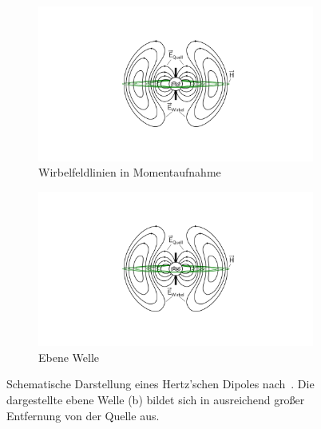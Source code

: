 \begin{figure}[ht]
    \centering
    \begin{subfigure}[b]{0.4\textwidth}
        \includegraphics[page = 1, height=0.2\textheight, trim = 10cm 4cm 9.5cm 4cm, clip]{Abbildungen/Kapitel2/Hertz-Dipol.pdf}
        \caption{Wirbelfeldlinien in Momentaufnahme}\label{subfig:2_Hertzscher_Dipol_A}
    \end{subfigure}
    \hspace{1cm}
    \begin{subfigure}[b]{0.4\textwidth}
        \includegraphics[page = 2, height=0.2\textheight, trim = 4.5cm 0cm 8cm 0cm, clip]{Abbildungen/Kapitel2/Hertz-Dipol.pdf}
        \caption{Ebene Welle}\label{subfig:2_Hertzscher_Dipol_B}
    \end{subfigure}
    \caption[Schematische Darstellung eines Hertz'schen Dipoles]{Schematische Darstellung eines Hertz'schen Dipoles nach~\cite{EM_Schirmung}. Die dargestellte ebene Welle (b) bildet sich in ausreichend großer Entfernung von der Quelle aus.}
    \label{fig:2_Hertzscher_Dipol}
\end{figure}


